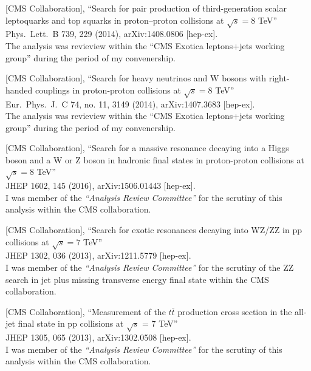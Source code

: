 \documentclass[10pt, a4paper]{article}
\begin{document}
\begin{thebibliography}{599}
  [CMS Collaboration],
 ``Search for pair production of third-generation scalar leptoquarks
  and top squarks in proton–proton collisions at $\sqrt{s}=8$ TeV''\\
  Phys.\ Lett.\ B 739, 229 (2014), arXiv:1408.0806 [hep-ex].\\
The analysis was revieview within the ``CMS Exotica leptons+jets working group'' during
the period of my convenership.

  [CMS Collaboration],
 ``Search for heavy neutrinos and $\mathrm {W}$ bosons with
  right-handed couplings in proton-proton collisions at $\sqrt{s}=8$ TeV''\\
  Eur.\ Phys.\ J.\ C 74, no. 11, 3149 (2014), arXiv:1407.3683
  [hep-ex].\\
The analysis was revieview within the ``CMS Exotica leptons+jets working group'' during
the period of my convenership.

[CMS Collaboration],
``Search for a massive resonance decaying into a Higgs boson and a W or Z boson in hadronic final states in proton-proton collisions at $ \sqrt{s}=8 $ TeV''\\
  JHEP 1602, 145 (2016), arXiv:1506.01443 [hep-ex].
  \\ I was member of the {\it``Analysis Review Committee''} for the scrutiny of this analysis within the CMS collaboration. 

[CMS Collaboration],
 ``Search for exotic resonances decaying into WZ/ZZ in pp collisions at $\sqrt{s}=7$ TeV''\\
 JHEP 1302, 036 (2013), arXiv:1211.5779 [hep-ex].
  \\ I was member of the {\it``Analysis Review Committee''} for the scrutiny of the ZZ search in jet plus missing transverse energy final state within the CMS collaboration. 

[CMS Collaboration],
  ``Measurement of the $t\bar{t}$ production cross section in the all-jet final state in pp collisions at $\sqrt{s}$ = 7 TeV''\\
  JHEP 1305, 065 (2013), arXiv:1302.0508 [hep-ex].
  \\ I was member of the {\it``Analysis Review Committee''} for the scrutiny of this analysis within the CMS collaboration. 


\end{thebibliography}
\end{document}
